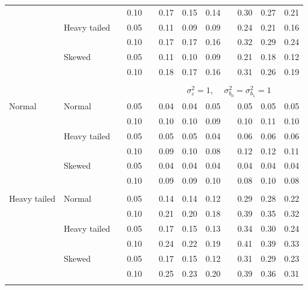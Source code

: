 \documentclass[12pt]{article} %
\begin{document}
\begin{table}[ht]
\begin{scriptsize}
\begin{center}
\begin{tabular}{ll p{.1cm} c p{.1cm} rrr p{.1cm} rrr}
             &              && 0.10 &&  0.17 & 0.15 & 0.14 && 0.30 & 0.27 & 0.21 \\ 
             & Heavy tailed && 0.05 &&  0.11 & 0.09 & 0.09 && 0.24 & 0.21 & 0.16 \\ 
             &              && 0.10 &&  0.17 & 0.17 & 0.16 && 0.32 & 0.29 & 0.24 \\ 
             & Skewed       && 0.05 &&  0.11 & 0.10 & 0.09 && 0.21 & 0.18 & 0.12 \\ 
             &              && 0.10 &&  0.18 & 0.17 & 0.16 && 0.31 & 0.26 & 0.19 \\ 

&&&&&&&&&&&\\
& && && \multicolumn{7}{c}{$\sigma_{\varepsilon}^2 = 1$, \ \ $\sigma_{b_0}^2 = \sigma_{b_1}^2 = 1$} \\ \cline{6-12}
\rowcolor{gray!20}Normal       & Normal       && 0.05 &&  0.04 & 0.04 & 0.05 && 0.05 & 0.05 & 0.05 \\ 
\rowcolor{gray!20}             &              && 0.10 &&  0.10 & 0.10 & 0.09 && 0.10 & 0.11 & 0.10 \\ 
\rowcolor{gray!20}             & Heavy tailed && 0.05 &&  0.05 & 0.05 & 0.04 && 0.06 & 0.06 & 0.06 \\ 
\rowcolor{gray!20}             &              && 0.10 &&  0.09 & 0.10 & 0.08 && 0.12 & 0.12 & 0.11 \\ 
\rowcolor{gray!20}             & Skewed       && 0.05 &&  0.04 & 0.04 & 0.04 && 0.04 & 0.04 & 0.04 \\ 
\rowcolor{gray!20}             &              && 0.10 &&  0.09 & 0.09 & 0.10 && 0.08 & 0.10 & 0.08 \\ 
             &&&&&&&&&&&\\
Heavy tailed & Normal       && 0.05 &&  0.14 & 0.14 & 0.12 && 0.29 & 0.28 & 0.22 \\ 
             &              && 0.10 &&  0.21 & 0.20 & 0.18 && 0.39 & 0.35 & 0.32 \\ 
             & Heavy tailed && 0.05 &&  0.17 & 0.15 & 0.13 && 0.34 & 0.30 & 0.24 \\ 
             &              && 0.10 &&  0.24 & 0.22 & 0.19 && 0.41 & 0.39 & 0.33 \\ 
             & Skewed       && 0.05 &&  0.17 & 0.15 & 0.12 && 0.31 & 0.29 & 0.23 \\ 
             &              && 0.10 &&  0.25 & 0.23 & 0.20 && 0.39 & 0.36 & 0.31 \\ 
             &&&&&&&&&&&\\

\end{tabular}
\end{center}
\end{scriptsize}
\end{table}
\end{document}
